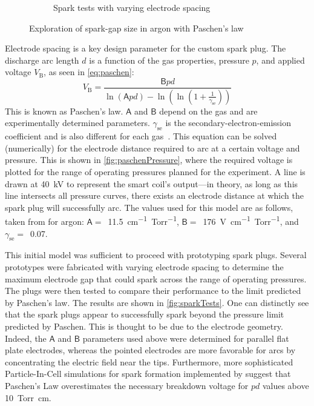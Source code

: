 \begin{figure}[h]
\begin{subfigure}[t]{0.47\textwidth}
                    \caption{Spark tests with varying electrode spacing}
                    \label{fig:sparkTests}
                \end{subfigure}
                \caption{Exploration of spark-gap size in argon with Paschen's law}
                \label{fig:sparking}
            \end{figure}

            Electrode spacing is a key design parameter for the custom spark plug. The discharge arc length $d$ is a function of the gas properties, pressure $p$, and applied voltage $V_\mathrm{B}$, as seen in \autoref{eq:paschen}:
            \begin{equation}
                V_\mathrm{B} = \frac{\mathsf{B} pd}{\ln{(\mathsf{A} pd)}-\ln{\left(\ln{\left(1+\frac{1}{\gamma_\mathrm{se}}\right)}\right)}}
                \label{eq:paschen}
            \end{equation}
            This is known as Paschen's law. $\mathsf{A}$ and $\mathsf{B}$ depend on the gas and are experimentally determined parameters. $\gamma_\mathrm{se}$ is the secondary-electron-emission coefficient and is also different for each gas~\cite{liebermanPrinciplesPlasmaDischarges2005}. This equation can be solved (numerically) for the electrode distance required to arc at a certain voltage and pressure. This is shown in \autoref{fig:paschenPressure}, where the required voltage is plotted for the range of operating pressures planned for the experiment. A line is drawn at \qty{40}{kV} to represent the smart coil's output---in theory, as long as this line intersects all pressure curves, there exists an electrode distance at which the spark plug will successfully arc. The values used for this model are as follows, taken from \textcite{liebermanPrinciplesPlasmaDischarges2005,theisComputingPaschenCurve2021} for argon: $\mathsf{A} =$~\qty{11.5}{cm^{-1}.Torr^{-1}}, $\mathsf{B} =$~\qty{176}{V.cm^{-1}.Torr^{-1}}, and $\gamma_\mathrm{se} =$~0.07.

            This initial model was sufficient to proceed with prototyping spark plugs. Several prototypes were fabricated with varying electrode spacing to determine the maximum electrode gap that could spark across the range of operating pressures. The plugs were then tested to compare their performance to the limit predicted by Paschen's law. The results are shown in \autoref{fig:sparkTests}. One can distinctly see that the spark plugs appear to successfully spark beyond the pressure limit predicted by Paschen. This is thought to be due to the electrode geometry. Indeed, the $\mathsf{A}$ and $\mathsf{B}$ parameters used above were determined for parallel flat plate electrodes, whereas the pointed electrodes are more favorable for arcs by concentrating the electric field near the tips. Furthermore, more sophisticated Particle-In-Cell simulations for spark formation implemented by \textcite{theisComputingPaschenCurve2021} suggest that Paschen's Law overestimates the necessary breakdown voltage for $pd$ values above \qty{10}{Torr.cm}.

